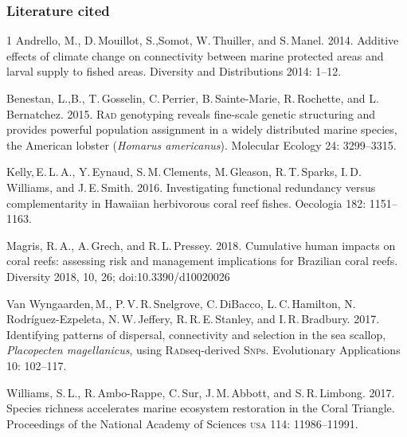 \documentclass[12pt, addpoints]{exam}
\begin{document}
\begin{questions}

\end{questions}

\subsubsection*{Literature cited}

\begin{hangparas}{\leftmargin}{1}
Andrello, M., D.\,Mouillot, S.,Somot, W.\,Thuiller, and S.\,Manel. 2014. Additive effects of climate change on connectivity between marine protected areas and larval supply to fished areas. Diversity and Distributions 2014: 1--12.

Benestan, L.,B., T.\,Gosselin, C.\,Perrier, B.\,Sainte-Marie, R.\,Rochette, and L.\,Bernatchez. 2015. R\textsc{ad} genotyping reveals fine-scale genetic structuring and provides powerful population assignment in a widely distributed marine species, the American lobster (\textit{Homarus americanus}). Molecular Ecology 24: 3299–3315.

Kelly,\,E.\,L.\,A., Y.\,Eynaud, S.\,M.\,Clements, M.\,Gleason, R.\,T.\,Sparks, I.\,D.\,Williams, and J.\,E.\,Smith. 2016. 
Investigating functional redundancy versus complementarity in Hawaiian herbivorous coral reef fishes. Oecologia 182: 1151–1163.

Magris, R.\,A., A.\,Grech, and R.\,L.\,Pressey. 2018. 
Cumulative human impacts on coral reefs: assessing risk and management implications for Brazilian coral reefs. Diversity 2018, 10, 26; doi:10.3390/d10020026

Van Wyngaarden,\,M., P.\,V.\,R.\,Snelgrove, C.\,DiBacco, L.\,C.\,Hamilton, N.\,Rodríguez-Ezpeleta, N.\,W.\,Jeffery, R.\,R.\,E.\,Stanley, and I.\,R.\,Bradbury. 2017. Identifying patterns of dispersal, connectivity and selection in the sea scallop, \textit{Placopecten magellanicus}, using R\textsc{ad}seq-derived S\textsc{np}s. Evolutionary Applications 10: 102–117.

Williams, S.\,L., R.\,Ambo-Rappe, C.\,Sur, J.\,M.\,Abbott, and S.\,R.\,Limbong. 2017. Species richness accelerates marine ecosystem restoration in the Coral Triangle. Proceedings of the National Academy of Sciences \textsc{usa} 114: 11986–11991.


\end{hangparas}
\end{document}
